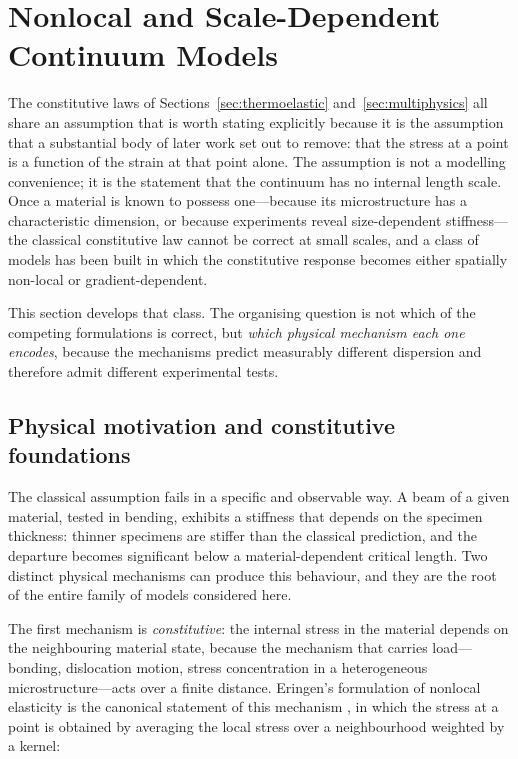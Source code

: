 \section{Nonlocal and Scale-Dependent Continuum Models}
\label{sec:nonlocal}

The constitutive laws of Sections~\ref{sec:thermoelastic} and~\ref{sec:multiphysics} all share an assumption that is worth stating explicitly because it is the assumption that a substantial body of later work set out to remove: that the stress at a point is a function of the strain at that point alone. The assumption is not a modelling convenience; it is the statement that the continuum has no internal length scale. Once a material is known to possess one---because its microstructure has a characteristic dimension, or because experiments reveal size-dependent stiffness---the classical constitutive law cannot be correct at small scales, and a class of models has been built in which the constitutive response becomes either spatially non-local or gradient-dependent.

This section develops that class. The organising question is not which of the competing formulations is correct, but \emph{which physical mechanism each one encodes}, because the mechanisms predict measurably different dispersion and therefore admit different experimental tests.

\subsection{Physical motivation and constitutive foundations}
\label{sec:7.1}

The classical assumption fails in a specific and observable way. A beam of a given material, tested in bending, exhibits a stiffness that depends on the specimen thickness: thinner specimens are stiffer than the classical prediction, and the departure becomes significant below a material-dependent critical length. Two distinct physical mechanisms can produce this behaviour, and they are the root of the entire family of models considered here.

The first mechanism is \emph{constitutive}: the internal stress in the material depends on the neighbouring material state, because the mechanism that carries load---bonding, dislocation motion, stress concentration in a heterogeneous microstructure---acts over a finite distance. Eringen's formulation of nonlocal elasticity is the canonical statement of this mechanism \cite{Eringen1972,Eringen1974}, in which the stress at a point is obtained by averaging the local stress over a neighbourhood weighted by a kernel:

